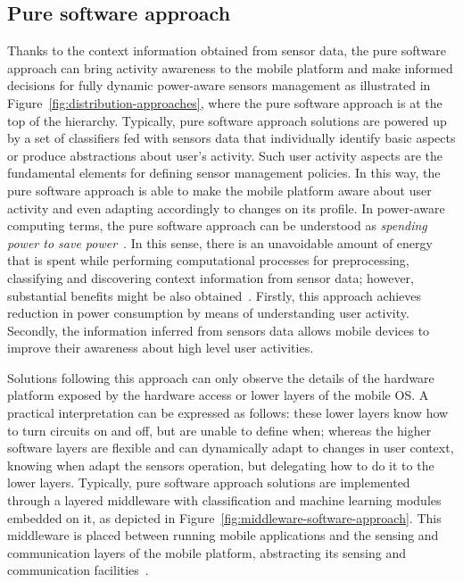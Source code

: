 \documentclass[ENG,PhD]{cinvestav}
\begin{document}
\subsection{Pure software approach}
Thanks to the context information obtained from sensor data, the pure software approach can bring activity awareness to the mobile platform and make informed decisions for fully dynamic power-aware sensors management as illustrated in Figure~\ref{fig:distribution-approaches}, where the pure software approach is at the top of the hierarchy.
Typically, pure software approach solutions are powered up by a set of classifiers fed with sensors data that individually identify basic aspects or produce abstractions about user's activity.
Such user activity aspects are the fundamental elements for defining sensor management policies.
In this way, the pure software approach is able to make the mobile platform aware about user activity and even adapting accordingly to changes on its profile.
In power-aware computing terms, the pure software approach can be understood as \emph{spending power to save power}~\cite{Ranganathan2010}.
In this sense, there is an unavoidable amount of energy that is spent while performing computational processes for preprocessing, classifying and discovering context information from sensor data; however, substantial benefits might be also obtained~\cite{Yurur2014c}.
Firstly, this approach achieves reduction in power consumption by means of understanding user activity.
Secondly, the information inferred from sensors data allows mobile devices to improve their awareness about high level user activities.

Solutions following this approach can only observe the details of the hardware platform exposed by the hardware access or lower layers of the mobile OS.
A practical interpretation can be expressed as follows: these lower layers know how to turn circuits on and off, but are unable to define when; whereas the higher software layers are flexible and can dynamically adapt to changes in user context, knowing when adapt the sensors operation, but delegating how to do it to the lower layers.
Typically, pure software approach solutions are implemented through a layered middleware with classification and machine learning modules embedded on it, as depicted in Figure~\ref{fig:middleware-software-approach}.
This middleware is placed between running mobile applications and the sensing and communication layers of the mobile platform, abstracting its sensing and communication facilities~\cite{Yurur2014}.
\end{document}

